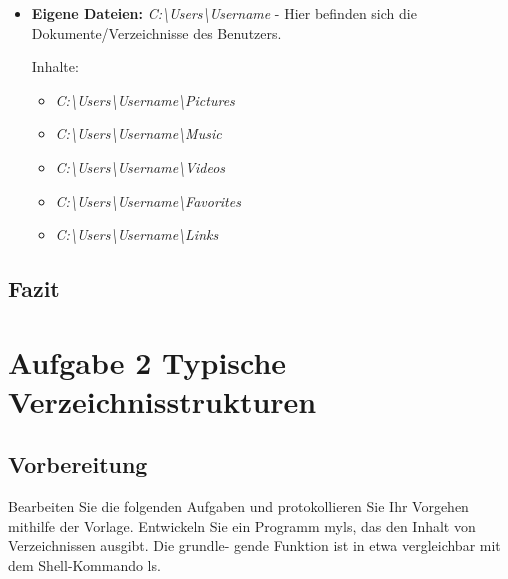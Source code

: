 \begin{itemize}
\begin{itemize}
\item 	\textbf{Eigene Dateien:} 	\textit{C:\textbackslash Users\textbackslash Username} -
Hier befinden sich die Dokumente/Verzeichnisse des Benutzers.

Inhalte:
	\begin{itemize}
	\item \textit{C:\textbackslash Users\textbackslash Username\textbackslash Pictures}
	\item \textit{C:\textbackslash Users\textbackslash Username\textbackslash Music}
	\item \textit{C:\textbackslash Users\textbackslash Username\textbackslash Videos}
	\item \textit{C:\textbackslash Users\textbackslash Username\textbackslash Favorites}
	\item \textit{C:\textbackslash Users\textbackslash Username\textbackslash Links}
	\end{itemize}
\end{itemize}
	\end{itemize}

	\subsection{Fazit}

\newpage
\section{Aufgabe 2 Typische Verzeichnisstrukturen}
\subsection{Vorbereitung}
Bearbeiten Sie die folgenden Aufgaben und protokollieren Sie Ihr Vorgehen mithilfe der Vorlage.
Entwickeln Sie ein Programm myls, das den Inhalt von Verzeichnissen ausgibt. Die grundle-
gende Funktion ist in etwa vergleichbar mit dem Shell-Kommando ls.


